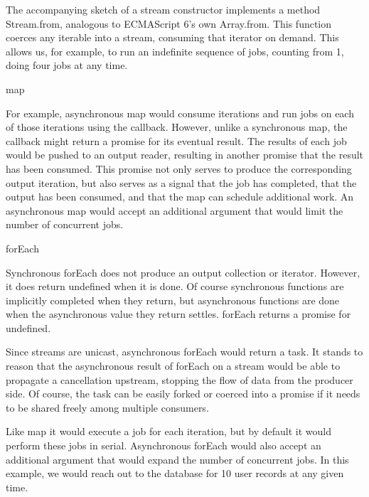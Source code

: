 The accompanying sketch of a stream constructor implements a method Stream.from, analogous to ECMAScript 6's own Array.from. This function coerces any iterable into a stream, consuming that iterator on demand. This allows us, for example, to run an indefinite sequence of jobs, counting from 1, doing four jobs at any time.


map

For example, asynchronous map would consume iterations and run jobs on each of those iterations using the callback. However, unlike a synchronous map, the callback might return a promise for its eventual result. The results of each job would be pushed to an output reader, resulting in another promise that the result has been consumed. This promise not only serves to produce the corresponding output iteration, but also serves as a signal that the job has completed, that the output has been consumed, and that the map can schedule additional work. An asynchronous map would accept an additional argument that would limit the number of concurrent jobs.

forEach

Synchronous forEach does not produce an output collection or iterator. However, it does return undefined when it is done. Of course synchronous functions are implicitly completed when they return, but asynchronous functions are done when the asynchronous value they return settles. forEach returns a promise for undefined.

Since streams are unicast, asynchronous forEach would return a task. It stands to reason that the asynchronous result of forEach on a stream would be able to propagate a cancellation upstream, stopping the flow of data from the producer side. Of course, the task can be easily forked or coerced into a promise if it needs to be shared freely among multiple consumers.

Like map it would execute a job for each iteration, but by default it would perform these jobs in serial. Asynchronous forEach would also accept an additional argument that would expand the number of concurrent jobs. In this example, we would reach out to the database for 10 user records at any given time.

